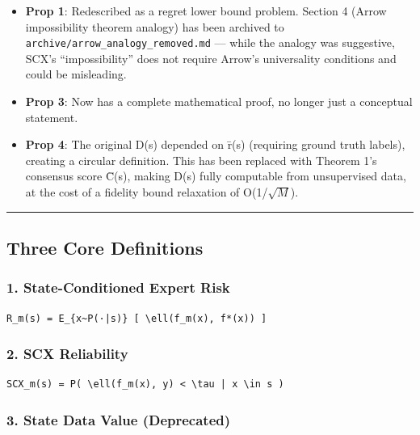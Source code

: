 \documentclass[
  12pt,
]{article}
\providecommand{\tightlist}{%
  \setlength{\itemsep}{0pt}\setlength{\parskip}{0pt}}
\begin{document}
\begin{itemize}
\tightlist
\item
  \textbf{Prop 1}: Redescribed as a regret lower bound problem. Section 4 (Arrow impossibility theorem analogy) has been archived to \texttt{archive/arrow\_analogy\_removed.md} --- while the analogy was suggestive, SCX's ``impossibility'' does not require Arrow's universality conditions and could be misleading.
\item
  \textbf{Prop 3}: Now has a complete mathematical proof, no longer just a conceptual statement.
\item
  \textbf{Prop 4}: The original D(s) depended on \={r}(s) (requiring ground truth labels), creating a circular definition. This has been replaced with Theorem 1's consensus score \={C}(s), making D(s) fully computable from unsupervised data, at the cost of a fidelity bound relaxation of O(1/$\sqrt{M}$).
\end{itemize}

\begin{center}\rule{0.5\linewidth}{0.5pt}\end{center}

\subsection{Three Core Definitions}\label{three-core-definitions}

\subsubsection{1. State-Conditioned Expert Risk}\label{state-conditioned-expert-risk}

\begin{verbatim}
R_m(s) = E_{x~P(·|s)} [ \ell(f_m(x), f*(x)) ]
\end{verbatim}

\subsubsection{2. SCX Reliability}\label{scx-reliability}

\begin{verbatim}
SCX_m(s) = P( \ell(f_m(x), y) < \tau | x \in s )
\end{verbatim}

\subsubsection{3. State Data Value (Deprecated)}\label{state-data-value-deprecated}
\end{document}
